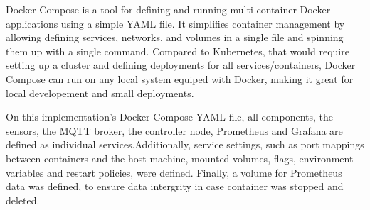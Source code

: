 Docker Compose is a tool for defining and running multi-container Docker applications using a simple YAML file. It simplifies container management by allowing defining services, networks, and volumes in a single file and spinning them up with a single command. Compared to Kubernetes, that would require setting up a cluster and defining deployments for all services/containers, Docker Compose can run on any local system equiped with Docker, making it great for local developement and small deployments.

On this implementation's Docker Compose YAML file, all components, the sensors, the MQTT broker, the controller node, Prometheus and Grafana are defined as individual services.Additionally, service settings, such as port mappings between containers and the host machine, mounted volumes, flags, environment variables and restart policies, were defined. Finally, a volume for Prometheus data was defined, to ensure data intergrity in case container was stopped and deleted.

